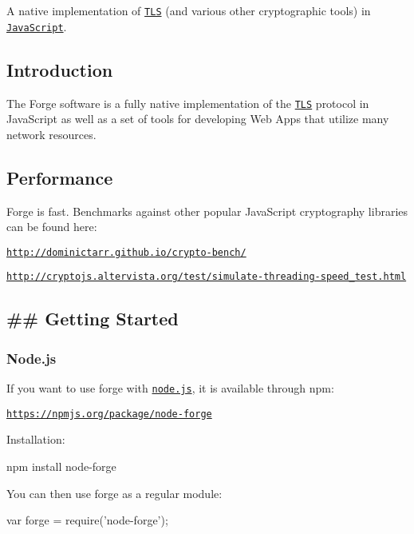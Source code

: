 \href{https://travis-ci.org/digitalbazaar/forge}{\tt }

A native implementation of \href{http://en.wikipedia.org/wiki/Transport_Layer_Security}{\tt T\+LS} (and various other cryptographic tools) in \href{http://en.wikipedia.org/wiki/JavaScript}{\tt Java\+Script}.

\subsection*{Introduction}

The Forge software is a fully native implementation of the \href{http://en.wikipedia.org/wiki/Transport_Layer_Security}{\tt T\+LS} protocol in Java\+Script as well as a set of tools for developing Web Apps that utilize many network resources.

\subsection*{Performance}

Forge is fast. Benchmarks against other popular Java\+Script cryptography libraries can be found here\+:

\href{http://dominictarr.github.io/crypto-bench/}{\tt http\+://dominictarr.\+github.\+io/crypto-\/bench/}

\href{http://cryptojs.altervista.org/test/simulate-threading-speed_test.html}{\tt http\+://cryptojs.\+altervista.\+org/test/simulate-\/threading-\/speed\+\_\+test.\+html}

\subsection*{\#\# Getting Started }

\subsubsection*{Node.\+js}

If you want to use forge with \href{http://nodejs.org/}{\tt node.\+js}, it is available through {\ttfamily npm}\+:

\href{https://npmjs.org/package/node-forge}{\tt https\+://npmjs.\+org/package/node-\/forge}

Installation\+: \begin{DoxyVerb}npm install node-forge
\end{DoxyVerb}


You can then use forge as a regular module\+: \begin{DoxyVerb}var forge = require('node-forge');
\end{DoxyVerb}


